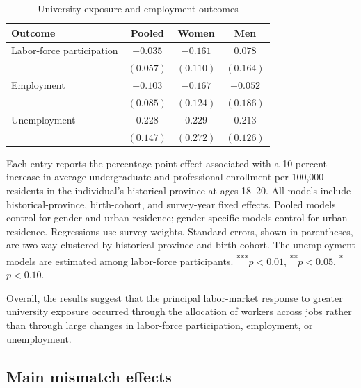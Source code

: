 \begin{table}[htbp]
  \centering
  \caption{University exposure and employment outcomes}
  \label{tab:employment}
  \begin{threeparttable}
  \begin{tabular}{lccc}
    \toprule
    Outcome & Pooled & Women & Men \\
    \midrule
    Labor-force participation & $-0.035$  & $-0.161$  & $0.078$  \\
                              & $(0.057)$ & $(0.110)$ & $(0.164)$ \\
    Employment                & $-0.103$  & $-0.167$  & $-0.052$ \\
                              & $(0.085)$ & $(0.124)$ & $(0.186)$ \\
    Unemployment              & $0.228$   & $0.229$   & $0.213$  \\
                              & $(0.147)$ & $(0.272)$ & $(0.126)$ \\
    \bottomrule
  \end{tabular}
  \begin{tablenotes}[flushleft]
    \footnotesize
    \item Each entry reports the percentage-point effect associated with a 10 percent increase in average undergraduate and professional enrollment per 100,000 residents in the individual's historical province at ages 18--20. All models include historical-province, birth-cohort, and survey-year fixed effects. Pooled models control for gender and urban residence; gender-specific models control for urban residence. Regressions use survey weights. Standard errors, shown in parentheses, are two-way clustered by historical province and birth cohort. The unemployment models are estimated among labor-force participants. \textsuperscript{***}$p<0.01$, \textsuperscript{**}$p<0.05$, \textsuperscript{*}$p<0.10$.
  \end{tablenotes}
  \end{threeparttable}
\end{table}

Overall, the results suggest that the principal labor-market response to greater university exposure occurred through the allocation of workers across jobs rather than through large changes in labor-force participation, employment, or unemployment.

\subsection{Main mismatch effects}

